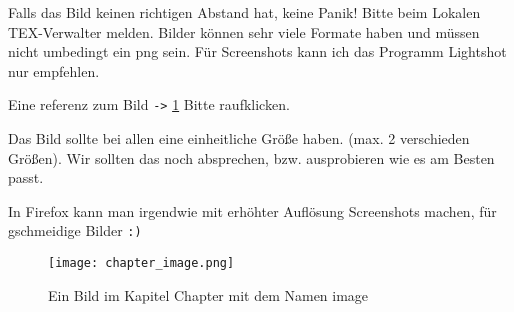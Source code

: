 Falls das Bild keinen richtigen Abstand hat, keine Panik! Bitte beim Lokalen TEX-Verwalter melden.
Bilder können sehr viele Formate haben und müssen nicht umbedingt ein png sein.
Für Screenshots kann ich das Programm Lightshot nur empfehlen.

Eine referenz zum Bild \verb+->+ \ref{chapter:image} Bitte raufklicken.

Das Bild sollte bei allen eine einheitliche Größe haben. (max. 2 verschieden Größen). Wir sollten das noch absprechen,
bzw. ausprobieren wie es am Besten passt.

In Firefox kann man irgendwie mit erhöhter Auflösung Screenshots machen, für gschmeidige Bilder \verb-:)-

\begin{figure}[h]
    \centering
    \texttt{[image: chapter\_image.png]}
    \caption{Ein Bild im Kapitel Chapter mit dem Namen image}
    \label{chapter:image}
\end{figure}

